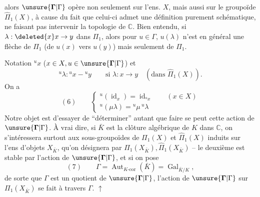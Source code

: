 alors $\unsure{\mathbf{\Gamma}|\Gamma}$ opère non seulement sur  l'ens. $X$, mais aussi sur le groupoïde $\widehat\Pi_1(X)$, à cause du fait que celui-ci admet une définition purement schématique, ne faisant pas intervenir la topologie de $\mathbb C$. Bien entendu, si $\lambda:\deleted{x} x\to y$ dans $\Pi_1$, alors pour $u\in\Gamma$, $u(\lambda)$ n'est  en général une flèche de $\Pi_1$ (de $u(x)$ vers $u(y)$) mais seulement de $\widehat\Pi_1$.

 Notation ${}^ux$ ($x\in X,u\in\unsure{\mathbf{\Gamma}|\Gamma}$) et 
\[
{}^u\lambda:{}^ux-{}^uy\qquad\text{si }\lambda:x\to y\quad(\text{dans }\widehat\Pi_1(X)).
\]
On a
\[
(6)\qquad\begin{cases}
{}^u(\operatorname{id}_x)=\operatorname{id}_{{}^ux}\qquad(x\in X)\\
{}^u(\mu\lambda)={}^u\mu\,{}^u\lambda
\end{cases}
\]
Notre objet est d'essayer de ``déterminer'' autant que faire se peut cette action de $\unsure{\mathbf{\Gamma}|\Gamma}$. À vrai dire, si $\bar K$ est la clôture algébrique de $K$ dans $\mathbb C$, on s'intéressera surtout aux sous-groupoïdes de $\Pi_1(X)$ et $\widehat\Pi_1(X)$ induits sur l'ens d'objets $X_{\bar K}$, qu'on désignera par $\Pi_1(X_{\bar K}),\widehat\Pi_1(X_{\bar K})$ -- le deuxième est stable par l'action de $\unsure{\mathbf{\Gamma}|\Gamma}$, et si on pose
\[
(7)\qquad\Gamma=\operatorname{Aut}_{K\text{-cor}}(\bar K)=\operatorname{Gal}_{\bar K/K},
\]
de sorte que $\Gamma$ est un quotient de $\unsure{\mathbf{\Gamma}|\Gamma}$, l'action de $\unsure{\mathbf{\Gamma}|\Gamma}$ sur $\Pi_1(X_{\bar K})$ se fait à travers $\Gamma$. $\uparrow$
